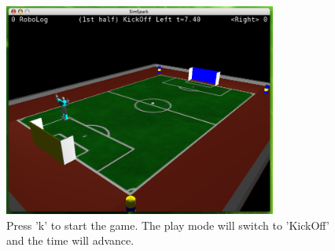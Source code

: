 \begin{figure}[htbp]
\begin{center}
\includegraphics[width=0.8\textwidth]{fig/presskickoff}
\caption{Press 'k' to start the game. The play mode will switch to 'KickOff' and the time will advance.}
\label{fig:presskickoff}
\end{center}
\end{figure}



